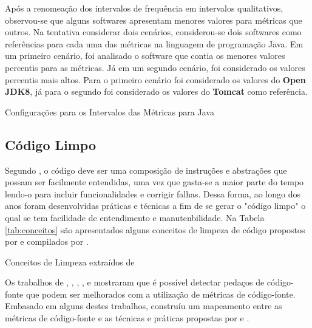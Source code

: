 \FloatBarrier

Após a renomeação dos intervalos de frequência em intervalos qualitativos, observou-se que alguns softwares apresentam menores valores para métricas que outros. Na tentativa considerar dois cenários, considerou-se dois softwares como referências para cada uma das métricas na linguagem de programação Java. Em um primeiro cenário, foi analisado o software que contia os menores valores percentis para as métricas. Já em um segundo cenário, foi considerado os valores percentis mais altos. Para o primeiro cenário foi considerado os valores do \textbf{Open JDK8}, já para o segundo foi considerado os valores do \textbf{Tomcat} como referência.


	
	\begin{table}[!ht]
	\begin{center}
		
	\caption{Configurações para os Intervalos das Métricas para Java}
	\label{tab:good-metrics}
	\end{center}
	\end{table}
	\FloatBarrier

\subsection{Código Limpo} 
\label{sec:clean-code}

Segundo , o código deve ser uma composição de instruções e abstrações que possam ser facilmente entendidas, uma vez que gasta-se a maior parte do tempo lendo-o para incluir funcionalidades e corrigir falhas. Dessa forma, ao longo dos anos foram desenvolvidas práticas e técnicas a fim de se gerar o "código limpo" o qual se tem facilidade de entendimento e manutenbilidade. Na Tabela \ref{tab:conceitos} são apresentados alguns conceitos de limpeza de código propostos por  e  compilados por .



\begin{table}[!ht]
\centering

\caption{Conceitos de Limpeza extraídos de }
\label{tab:conceitos}
\end{table}
\FloatBarrier

Os trabalhos de , , , ,  e  mostraram que é possível detectar pedaços de código-fonte que podem ser melhorados com a utilização de métricas de código-fonte. Embasado em alguns destes trabalhos,  construíu um mapeamento entre as métricas de código-fonte e as técnicas e práticas propostas por  e . 

